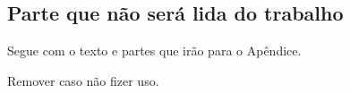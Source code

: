 
\begin{appendices}

\chapter{Parte que não será lida do trabalho}

Segue com o texto e partes que irão para o Apêndice. 

Remover caso não fizer uso.

\end{appendices}


\printindex
 
\cleardoublepage
\licenca


